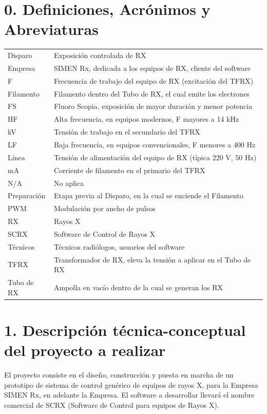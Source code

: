 \documentclass[
11pt, %
]{charter}
\begin{document}
\newpage
\section{0. Definiciones, Acrónimos y Abreviaturas}
\label{sec:definiciones}
\begin{tabular}{l l}
	Disparo 		& Exposición controlada de RX \\
	Empresa		& SIMEN Rx, dedicada a los equipos de RX, cliente del software \\
	F 			& Frecuencia de trabajo del equipo de RX (excitación del TFRX) \\
	Filamento	& Filamento dentro del Tubo de RX, el cual emite los electrones \\
	FS 			& Fluoro Scopia, exposición  de mayor duración y menor potencia \\
	HF 			& Alta frecuencia, en equipos modernos, F mayores a 14 kHz \\
	kV 			& Tensión de trabajo en el secundario del TFRX \\
	LF 			& Baja frecuencia, en equipos convencionales, F menores a 400 Hz \\
	Línea		& Tensión de alimentación del equipo de RX (típica 220 V, 50 Hz) \\
	mA			& Corriente de filamento en el primario del TFRX \\
	N/A			& No aplica \\
	Preparación	& Etapa previa al Disparo, en la cual se enciende el Filamento \\
	PWM			& Modulación por ancho de pulsos \\
	RX			& Rayos X \\
	SCRX			& Software de Control de Rayos X \\
	Técnicos		& Técnicos radiólogos, usuarios del software \\
	TFRX			& Transformador de RX, eleva la tensión a aplicar en el Tubo de RX \\
	Tubo de RX	& Ampolla en vacío dentro de la cual se generan los RX \\
\end{tabular} 


\newpage
\section{1. Descripción técnica-conceptual del proyecto a realizar}
\label{sec:descripcion}

El proyecto consiste en el diseño, construcción y puesta en marcha de un prototipo de sistema de control genérico de equipos de rayos X, para la Empresa SIMEN Rx, en adelante la Empresa. El software a desarrollar llevará el nombre comercial de SCRX (Software de Control para equipos de Rayos X).
\end{document}
